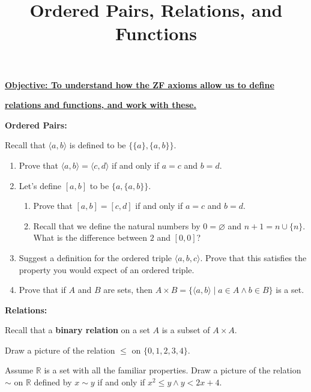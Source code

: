 \documentclass{article}
\begin{document}
\title{Ordered Pairs, Relations, and Functions}
\date{}

\maketitle
\thispagestyle{empty}

\Large

\textbf{\underline{Objective: To understand how the ZF axioms allow us to define}}

\textbf{\underline{relations and functions, and work with these.}}


\vspace{5mm}


\textbf{Ordered Pairs:}\bigskip

Recall that $\langle a,b\rangle$ is defined to be $\{\{a\},\{a,b\}\}$.\bigskip

\begin{enumerate}
	\item Prove that $\langle a,b\rangle=\langle c,d\rangle$ if and only if $a=c$ and $b=d$.
	\item Let's define $[a,b]$ to be $\{a,\{a,b\}\}$.
		\begin{enumerate}
			\item Prove that $[a,b]=[c,d]$ if and only if $a=c$ and $b=d$.
			\item Recall that we define the natural numbers by $0=\varnothing$ and $n+1=n\cup\{n\}$. What is the difference between $2$ and $[0,0]$?
		\end{enumerate}
	\item Suggest a definition for the ordered triple $\langle a,b,c\rangle$. Prove that this satisfies the property you would expect of an ordered triple.
	\item Prove that if $A$ and $B$ are sets, then $A\times B=\{\langle a,b\rangle\mid a\in A\wedge b\in B\}$ is a set.
\end{enumerate}


\clearpage





\textbf{Relations:}\bigskip

Recall that a \textbf{binary relation} on a set $A$ is a subset of $A\times A$.\bigskip



Draw a picture of the relation $\leq$ on $\{0,1,2,3,4\}$.

\vfill



Assume $\mathbb{R}$ is a set with all the familiar properties. Draw a picture of the relation $\sim$ on $\mathbb{R}$ defined by $x\sim y$ if and only if $x^2\leq y \wedge y<2x+4$.
\end{document}
